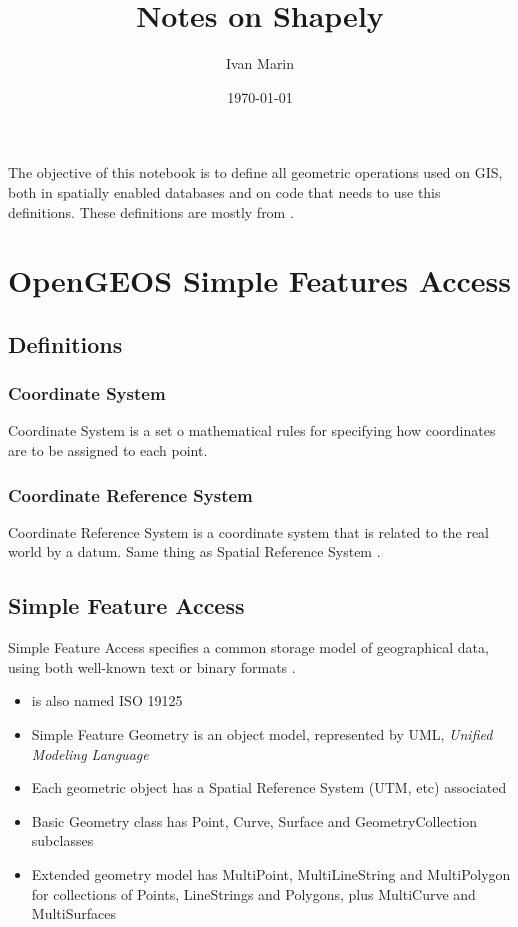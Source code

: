 \documentclass[11pt]{article}
\title{Notes on Shapely}
\author{Ivan Marin}
\date{\today} %
\begin{document}
\maketitle
The objective of this notebook is to define all geometric operations used on GIS, both in spatially enabled databases and on code that needs to use this definitions. These definitions are mostly from \cite{opengis_sfa_1, opengis_sfa_2}.

\section{OpenGEOS Simple Features Access}
\subsection{Definitions}

\subsubsection{Coordinate System}
Coordinate System is a set o mathematical rules for specifying how coordinates are to be assigned to each point.

\subsubsection{Coordinate Reference System} 
Coordinate Reference System is a coordinate system that is related to the real world by a datum. Same thing as Spatial Reference System \cite{wikipedia_contributors_spatial_2012}.

\subsection{Simple Feature Access} 
Simple Feature Access specifies  a common storage model of geographical data, using both well-known text or binary formats \cite{ wikipedia_contributors_simple_2012, opengis_sfa_1, opengis_sfa_2}.

\begin{itemize}
  \item \cite{opengis_sfa_1} is also named ISO 19125
  \item Simple Feature Geometry is an object model, represented by UML, \textit{Unified Modeling Language}
   \item Each geometric object has a Spatial Reference System (UTM, etc) associated
   \item Basic Geometry class has Point, Curve, Surface and GeometryCollection subclasses
  \item Extended geometry model has MultiPoint, MultiLineString and MultiPolygon for collections of Points, LineStrings and Polygons, plus MultiCurve and MultiSurfaces
\end{itemize}
\end{document}
